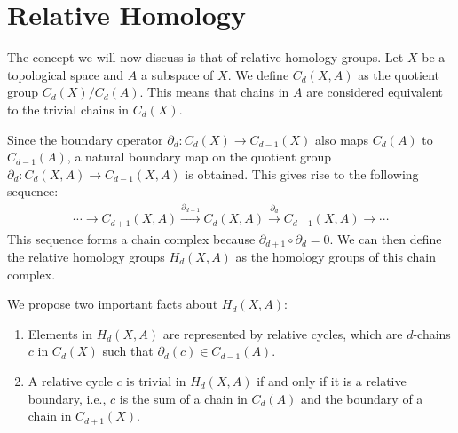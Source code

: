 \section{Relative Homology}
\label{RelativeHomology}
The concept we will now discuss is that of relative homology groups. Let \( X \) be a topological space and \( A \) a subspace of \( X \). We define \( C_{d}(X, A) \) as the quotient group \( C_{d}(X) / C_{d}(A) \). This means that chains in \( A \) are considered equivalent to the trivial chains in \( C_{d}(X) \).

Since the boundary operator \( \partial_{d}: C_{d}(X) \rightarrow C_{d-1}(X) \) also maps \( C_{d}(A) \) to \( C_{d-1}(A) \), a natural boundary map on the quotient group \( \partial_{d}: C_{d}(X, A) \rightarrow C_{d-1}(X, A) \) is obtained. This gives rise to the following sequence:
\begin{align}
\cdots \rightarrow C_{d+1}(X, A) \xrightarrow{\partial_{d+1}} C_{d}(X, A) \xrightarrow{\partial_{d}} C_{d-1}(X, A) \rightarrow \cdots
\end{align}
This sequence forms a chain complex because \( \partial_{d+1} \circ \partial_{d} = 0 \). We can then define the relative homology groups \( H_{d}(X, A) \) as the homology groups of this chain complex.

We propose two important facts about \( H_{d}(X, A) \):

\begin{proposition}{\cite[\S 2.1]{hatcher2005algebraic}}
\begin{enumerate}
    \item Elements in \( H_{d}(X, A) \) are represented by relative cycles, which are \( d \)-chains \( c \) in \( C_{d}(X) \) such that \( \partial_{d}(c) \in C_{d-1}(A) \).
    \item A relative cycle \( c \) is trivial in \( H_{d}(X, A) \) if and only if it is a relative boundary, i.e., \( c \) is the sum of a chain in \( C_{d}(A) \) and the boundary of a chain in \( C_{d+1}(X) \).
\end{enumerate}
\end{proposition}

